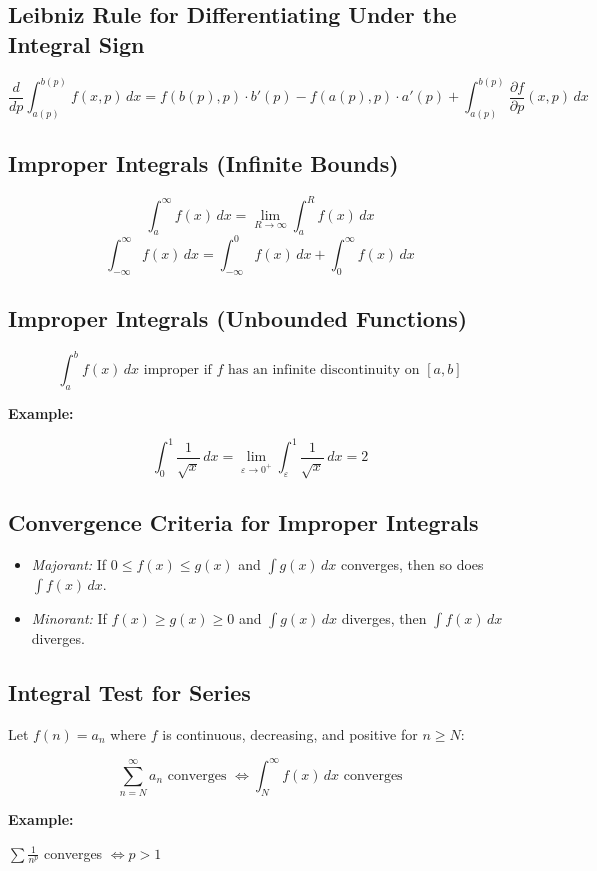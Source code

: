 \subsection{Leibniz Rule for Differentiating Under the Integral Sign}

\[
    \frac{d}{dp} \int_{a(p)}^{b(p)} f(x, p)\,dx = f(b(p), p) \cdot b'(p) - f(a(p), p) \cdot a'(p) + \int_{a(p)}^{b(p)} \frac{\partial f}{\partial p}(x, p)\,dx
\]

\subsection{Improper Integrals (Infinite Bounds)}

\[
    \int_a^\infty f(x)\,dx = \lim_{R \to \infty} \int_a^R f(x)\,dx
\]
\[
    \int_{-\infty}^\infty f(x)\,dx = \int_{-\infty}^0 f(x)\,dx + \int_0^\infty f(x)\,dx
\]

\subsection{Improper Integrals (Unbounded Functions)}

\[
    \int_a^b f(x)\,dx \text{ improper if } f \text{ has an infinite discontinuity on } [a, b]
\]

\textbf{Example:}

\[
    \int_0^1 \frac{1}{\sqrt{x}}\,dx = \lim_{\varepsilon \to 0^+} \int_\varepsilon^1 \frac{1}{\sqrt{x}}\,dx = 2
\]

\subsection{Convergence Criteria for Improper Integrals}

\begin{itemize}

    \item \emph{Majorant:} If \(0 \le f(x) \le g(x)\) and \(\int g(x)\,dx\) converges, then so does \(\int f(x)\,dx\).

    \item \emph{Minorant:} If \(f(x) \ge g(x) \ge 0\) and \(\int g(x)\,dx\) diverges, then \(\int f(x)\,dx\) diverges.

\end{itemize}

\subsection{Integral Test for Series}

Let \(f(n) = a_n\) where \(f\) is continuous, decreasing, and positive for \(n \ge N\):

\[
    \sum_{n=N}^\infty a_n \text{ converges } \iff \int_N^\infty f(x)\,dx \text{ converges}
\]

\textbf{Example:}

\(\sum \frac{1}{n^p}\) converges \(\iff p > 1\)
